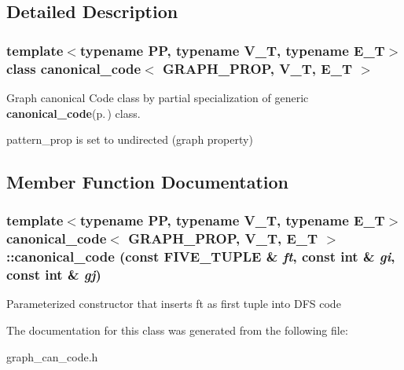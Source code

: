 \subsection{Detailed Description}
\subsubsection*{template$<$typename PP, typename V\_\-T, typename E\_\-T$>$ class canonical\_\-code$<$ GRAPH\_\-PROP, V\_\-T, E\_\-T $>$}

Graph canonical Code class by partial specialization of generic {\bf canonical\_\-code}{\rm (p.\,\pageref{classcanonical__code})} class. 

pattern\_\-prop is set to undirected (graph property) 



\subsection{Member Function Documentation}
\subsubsection{\setlength{\rightskip}{0pt plus 5cm}template$<$typename PP, typename V\_\-T, typename E\_\-T$>$ {\bf canonical\_\-code}$<$ GRAPH\_\-PROP, V\_\-T, E\_\-T $>$::{\bf canonical\_\-code} (const {\bf FIVE\_\-TUPLE} \& {\em ft}, const int \& {\em gi}, const int \& {\em gj})\hspace{0.3cm}{\tt  [inline]}}\label{classcanonical__code_3_01GRAPH__PROP_00_01V__T_00_01E__T_01_4_a1}


Parameterized constructor that inserts ft as first tuple into DFS code 

The documentation for this class was generated from the following file:\begin{CompactItemize}
\item 
graph\_\-can\_\-code.h\end{CompactItemize}
